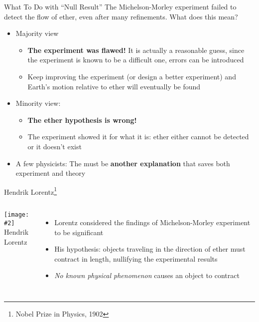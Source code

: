 \documentclass[12pt,compress,aspectratio=169]{beamer}
\newcommand{\pic}[2]{\texttt{[image: \#2]}}
\newcommand{\bigsqrt}{\ensuremath\sqrt{1-\left(\frac{v}{c}\right)^2}}
\newcommand{\lorentz}{\ensuremath\frac{1}{\bigsqrt}}
\newcommand{\eq}[2]{\vspace{#1}{\Large\begin{displaymath}#2\end{displaymath}}}
\begin{document}
\begin{frame}{What To Do with ``Null Result''}
  The Michelson-Morley experiment failed to detect the flow of ether, even
  after many refinements. What does this mean?
  \begin{itemize}
  \item Majority view
    \begin{itemize}
    \item\textbf{The experiment was flawed!} It is actually a reasonable
      guess, since the experiment is known to be a difficult one, errors can
      be introduced
    \item Keep improving the experiment (or design a better experiment) and
      Earth's motion relative to ether will eventually be found
    \end{itemize}
  \item Minority view:
    \begin{itemize}
    \item\textbf{The ether hypothesis is wrong!}
    \item The experiment showed it for what it is: ether either cannot be
      detected or it doesn't exist
    \end{itemize}
  \item A few physicists: The must be \textbf{another explanation} that saves
    both experiment and theory
  \end{itemize}
\end{frame}



\begin{frame}{Hendrik Lorentz\footnote{Nobel Prize in Physics, 1902}}
  \begin{columns}
    
    \begin{center}
      \pic{1.2}{graphics/lorentz.jpg}\\
          {\footnotesize Hendrik Lorentz}
    \end{center}
    
    \begin{itemize}
    \item Lorentz considered the findings of Michelson-Morley experiment to be
      significant
    \item His hypothesis: objects traveling in the direction of ether must
      contract in length, nullifying the experimental results
      
      \eq{-.2in}{
        \boxed{\gamma=\lorentz}
      }
    \item\emph{No known physical phenomenon} causes an object to contract
    \end{itemize}
  \end{columns}
\end{frame}
\end{document}
